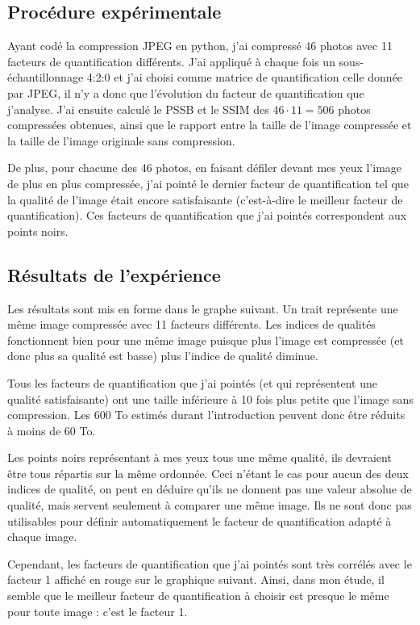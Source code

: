 \documentclass{article}
\begin{document}
\subsection{Procédure expérimentale}

Ayant codé la compression JPEG en python, j'ai compressé 46 photos avec 11 facteurs de quantification différents. J'ai appliqué à chaque fois un sous-échantillonnage 4:2:0 et j'ai choisi comme matrice de quantification celle donnée par JPEG, il n'y a donc que l'évolution du facteur de quantification que j'analyse. J'ai ensuite calculé le PSSB et le SSIM des $46 \cdot 11 = 506$ photos compressées obtenues, ainsi que le rapport entre la taille de l'image compressée et la taille de l'image originale sans compression.

De plus, pour chacune des 46 photos, en faisant défiler devant mes yeux l'image de plus en plus compressée, j'ai pointé le dernier facteur de quantification tel que la qualité de l'image était encore satisfaisante (c'est-à-dire le meilleur facteur de quantification). Ces facteurs de quantification que j'ai pointés correspondent aux points noirs.

\subsection{Résultats de l'expérience}

Les résultats sont mis en forme dans le graphe suivant. Un trait représente une même image compressée avec 11 facteurs différents. Les indices de qualités fonctionnent bien pour une même image puisque plus l'image est compressée (et donc plus sa qualité est basse) plus l'indice de qualité diminue. 

Tous les facteurs de quantification que j'ai pointés (et qui représentent une qualité satisfaisante) ont une taille inférieure à 10 fois plus petite que l'image sans compression. Les 600 To estimés durant l'introduction peuvent donc être réduits à moins de 60 To.

Les points noirs représentant à mes yeux tous une même qualité, ils devraient être tous répartis sur la même ordonnée. Ceci n'étant le cas pour aucun des deux indices de qualité, on peut en déduire qu'ils ne donnent pas une valeur absolue de qualité, mais servent seulement à comparer une même image. Ils ne sont donc pas utilisables pour définir automatiquement le facteur de quantification adapté à chaque image.

Cependant, les facteurs de quantification que j'ai pointés sont très corrélés avec le facteur 1 affiché en rouge sur le graphique suivant. Ainsi, dans mon étude, il semble que le meilleur facteur de quantification à choisir est presque le même pour toute image : c'est le facteur 1.
\end{document}
